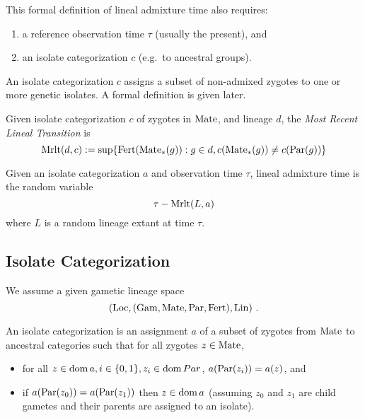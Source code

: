 \documentclass{article}
\begin{document}
This formal definition of lineal admixture time also requires:

\begin{enumerate}
\item
  a reference observation time \(\tau\) (usually the present), and
\item
  an isolate categorization \(c\) (e.g.~to ancestral groups).
\end{enumerate}

An isolate categorization \(c\) assigns a subset of non-admixed zygotes
to one or more genetic isolates. A formal definition is given later.

Given isolate categorization \(c\) of zygotes in \(\mathrm{Mate}\), and lineage
\(d\), the \emph{Most Recent Lineal Transition} is \[
\mathrm{Mrlt}(d,c) := \sup\{ \mathrm{Fert}(\mathrm{Mate}_*(g)) : g \in d, c(\mathrm{Mate}_*(g)) \not= c(\mathrm{Par}(g)) \}
\]

Given an isolate categorization \(a\) and observation time \(\tau\),
lineal admixture time is the random variable \[
\tau - \mathrm{Mrlt}(L, a)
\] where \(L\) is a random lineage extant at time \(\tau\).


\subsection{Isolate Categorization}

We assume a given gametic lineage space \[
(\mathrm{Loc}, (\mathrm{Gam}, \mathrm{Mate}, \mathrm{Par}, \mathrm{Fert}), \mathrm{Lin})
\text{ .}
\]

An isolate categorization is an assignment \(a\) of a subset of zygotes
from \(\mathrm{Mate}\) to ancestral categories such that for all zygotes
\(z \in \mathrm{Mate}\),

\begin{itemize}
\item
  for all \(z \in \operatorname{dom}{ a}, i \in \{0, 1\}, z_i \in \operatorname{dom}{ Par}\),
  \(a(\mathrm{Par}(z_i)) = a(z)\), and
\item
  if \(a(\mathrm{Par}(z_0)) = a(\mathrm{Par}(z_1))\) then \(z \in \operatorname{dom}{ a}\) (assuming
  \(z_0\) and \(z_1\) are child gametes and their parents are assigned
  to an isolate).
\end{itemize}


\printbibliography
\end{document}
